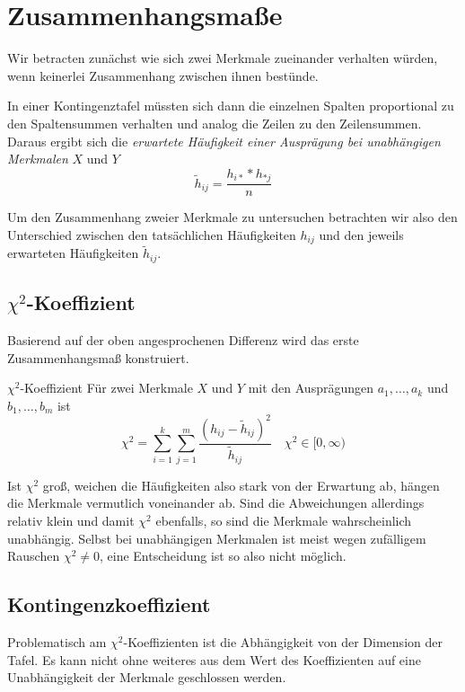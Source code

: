 \section{Zusammenhangsmaße}
Wir betracten zunächst wie sich zwei Merkmale zueinander verhalten würden, wenn keinerlei Zusammenhang zwischen ihnen bestünde.

In einer Kontingenztafel müssten sich dann die einzelnen Spalten proportional zu den Spaltensummen verhalten und analog die Zeilen zu den Zeilensummen.
Daraus ergibt sich die \emph{erwartete Häufigkeit einer Ausprägung bei unabhängigen Merkmalen} $X$ und $Y$
\begin{equation*}
	\tilde h_{ij}=\frac{h_{i*}*h_{*j}}{n}
\end{equation*}

Um den Zusammenhang zweier Merkmale zu untersuchen betrachten wir also den Unterschied zwischen den tatsächlichen Häufigkeiten $h_{ij}$ und den jeweils erwarteten Häufigkeiten $\tilde h_{ij}$.

\subsection{$\chi^2$-Koeffizient}
Basierend auf der oben angesprochenen Differenz wird das erste Zusammenhangsmaß konstruiert.
\begin{definition}{$\chi^2$-Koeffizient}
	Für zwei Merkmale $X$ und $Y$ mit den Ausprägungen $a_1,\ldots,a_k$ und $b_1,\ldots,b_m$ ist
	\begin{equation*}
		\chi^2 = \sum\limits_{i=1}^k\sum\limits_{j=1}^m\frac{(h_{ij}-\tilde h_{ij})^2}{\tilde h_{ij}}\quad \chi^2\in[0,\infty)
	\end{equation*}
\end{definition}

Ist $\chi^2$ groß, weichen die Häufigkeiten also stark von der Erwartung ab, hängen die Merkmale vermutlich voneinander ab. Sind die Abweichungen allerdings relativ klein und damit $\chi^2$ ebenfalls, so sind die Merkmale wahrscheinlich unabhängig. Selbst bei unabhängigen Merkmalen ist meist wegen zufälligem Rauschen $\chi^2\neq0$, eine Entscheidung ist so also nicht möglich.

\subsection{Kontingenzkoeffizient}
Problematisch am $\chi^2$-Koeffizienten ist die Abhängigkeit von der Dimension der Tafel. Es kann nicht ohne weiteres aus dem Wert des Koeffizienten auf eine Unabhängigkeit der Merkmale geschlossen werden.

